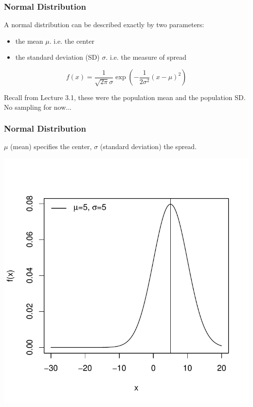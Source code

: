 \documentclass[slides]{beamer}
\newcommand{\blue}[1]{\textcolor{blue2}{#1}}
\begin{document}
\begin{frame}[fragile]
\frametitle{Normal Distribution}

A normal distribution can be described exactly by two \blue{parameters}:
\begin{itemize}
\item the \blue{mean $\mu$}. i.e. the center
\item the \blue{standard deviation (SD) $\sigma$}. i.e. the measure of spread
\end{itemize}

\pause\vspace{0.25cm}

\[
f(x) = \frac{1}{\sqrt{2\pi}\sigma}\exp\left( -\frac{1}{2\sigma^2}(x-\mu)^2 \right)
\]


\pause\vspace{0.25cm}

Recall from Lecture 3.1, these were the \blue{population mean} and the \blue{population SD}.  No sampling for now...

\end{frame}



\begin{frame}
\frametitle{Normal Distribution}
$\mu$ (mean) specifies the center, $\sigma$ (standard deviation) the spread.
\begin{center}
\includegraphics{figure/lec02-003}
\end{center}
\end{frame}
\end{document}
